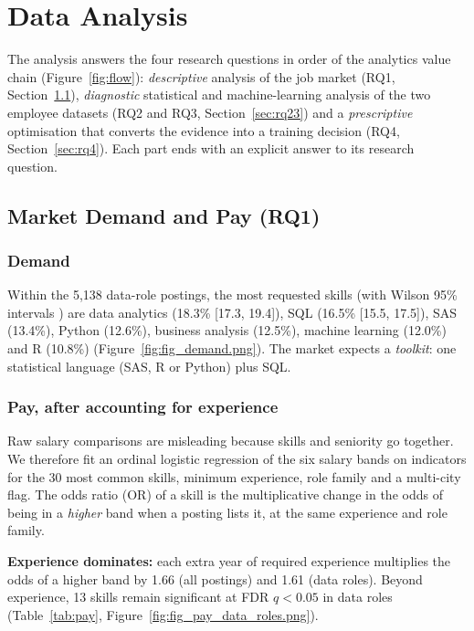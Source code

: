 \section{Data Analysis}\label{sec:analysis}

The analysis answers the four research questions in order of the analytics value chain
(Figure~\ref{fig:flow}): \emph{descriptive} analysis of the job market (RQ1,
Section~\ref{sec:rq1}), \emph{diagnostic} statistical and machine-learning analysis of the two
employee datasets (RQ2 and RQ3, Section~\ref{sec:rq23}) and a \emph{prescriptive} optimisation
that converts the evidence into a training decision (RQ4, Section~\ref{sec:rq4}). Each part ends
with an explicit answer to its research question.

\subsection{Market Demand and Pay (RQ1)}\label{sec:rq1}

\subsubsection{Demand}

Within the 5,138 data-role postings, the most requested skills (with Wilson 95\% intervals
\citep{wilson1927}) are data analytics (18.3\% [17.3, 19.4]), SQL (16.5\% [15.5, 17.5]), SAS (13.4\%),
Python (12.6\%), business analysis (12.5\%), machine learning (12.0\%) and R (10.8\%)
(Figure~\ref{fig:fig_demand.png}). The market expects a \emph{toolkit}: one statistical language
(SAS, R or Python) plus SQL.


\subsubsection{Pay, after accounting for experience}

Raw salary comparisons are misleading because skills and seniority go together. We therefore fit an
ordinal logistic regression of the six salary bands on indicators for the 30 most common skills,
minimum experience, role family and a multi-city flag. The odds ratio (OR) of a skill is the
multiplicative change in the odds of being in a \emph{higher} band when a posting lists it, at the
same experience and role family.

\textbf{Experience dominates:} each extra year of required experience multiplies the odds of a
higher band by 1.66 (all postings) and 1.61 (data roles). Beyond experience, 13 skills remain
significant at FDR $q<0.05$ in data roles (Table~\ref{tab:pay}, Figure~\ref{fig:fig_pay_data_roles.png}).

